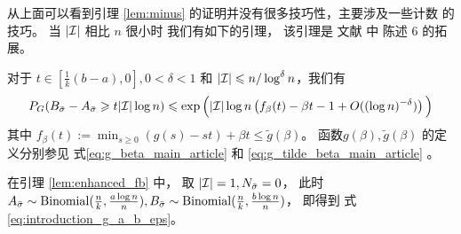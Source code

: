 从上面可以看到引理 \ref{lem:minus} 的证明并没有很多技巧性，主要涉及一些计数
的技巧。
当 $|\mathcal{I}|$ 相比  $n$ 很小时
我们有如下的引理， 该引理是 文献 中 陈述 6 的拓展。 

\begin{lemma}
  \label{lem:enhanced_fb}
	对于 $t\in [\frac{1}{k}(b-a), 0], 0<\delta <1$
	和 $ |\mathcal{I}| \leqslant n/\log^{\delta} n$，我们有
\begin{equation} \label{eq:upmpt}
	P_G(B_{\bar{\sigma}}-A_{\bar{\sigma}}\geqslant t |\mathcal{I}| \log n) 
	\leqslant  \exp\Big(|\mathcal{I}|\log n
	\left(
    f_{\beta}(t) - \beta t -1	+ O((\log n)^{-\delta}) \right)\Big)
	\end{equation}
	其中 $f_{\beta}(t) := \min_{s\geq 0} (g(s) - st) + \beta t \leq \tilde{g}(\beta) $。
  函数$g(\beta), \tilde{g}(\beta)$
  的定义分别参见
  式\eqref{eq:g_beta_main_article}
  和
  \eqref{eq:g_tilde_beta_main_article} 。
\end{lemma}

在引理 \ref{lem:enhanced_fb}  中，
取
$|\mathcal{I}|=1, N_{\bar{\sigma}}=0$，
此时$A_{\bar{\sigma}} \sim \operatorname{Binomial}(\frac{n}{k}, \frac{a \log n}{n}),
B_{\bar{\sigma}} \sim \operatorname{Binomial}(\frac{n}{k}, \frac{b \log n}{n})$，
即得到 式\eqref{eq:introduction_g_a_b_eps}。

